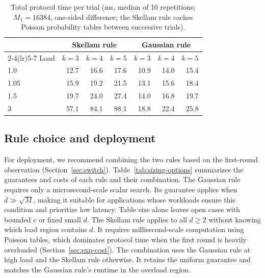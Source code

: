 \begin{table}[!htbp]
\centering
\caption{Total protocol time per trial (ms, median of 10 repetitions; $M_1=16384$, one-sided difference; the Skellam rule caches Poisson probability tables between successive trials).}
\label{tab:proto}
\begin{tabular}{lrrrrrr}
\toprule
& \multicolumn{3}{c}{Skellam rule} & \multicolumn{3}{c}{Gaussian rule}\\
\cmidrule(lr){2-4}\cmidrule(lr){5-7}
Load & $k=3$ & $k=4$ & $k=5$ & $k=3$ & $k=4$ & $k=5$\\
\midrule
1.0 & 12.7 & 16.6 & 17.6 & 10.9 & 14.0 & 15.4\\
1.05 & 15.9 & 19.2 & 21.5 & 13.1 & 15.6 & 18.4\\
1.5 & 19.7 & 24.0 & 27.4 & 14.0 & 16.8 & 19.7\\
3 & 57.1 & 84.1 & 88.1 & 18.8 & 22.4 & 25.8\\
\bottomrule
\end{tabular}
\end{table}

\subsection{Rule choice and deployment}\label{sec:exp-deploy}
For deployment, we recommend combining the two rules based on the first-round observation (Section~\ref{sec:switch}). Table~\ref{tab:sizing-options} summarizes the guarantees and costs of each rule and their combination. The Gaussian rule requires only a microsecond-scale scalar search. Its guarantee applies when $d\gg\sqrt M$, making it suitable for applications whose workloads ensure this condition and prioritize low latency. Table size alone leaves open cases with bounded $c$ or fixed small $d$. The Skellam rule applies to all $d\ge2$ without knowing which load region contains $d$. It requires millisecond-scale computation using Poisson tables, which dominates protocol time when the first round is heavily overloaded (Section~\ref{sec:exp-cost}). The combination uses the Gaussian rule at high load and the Skellam rule otherwise. It retains the uniform guarantee and matches the Gaussian rule's runtime in the overload region.

